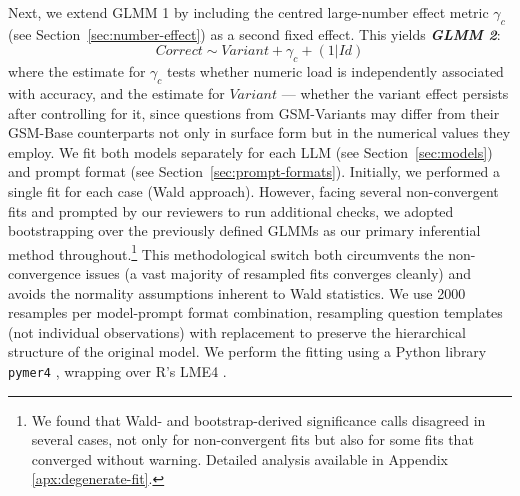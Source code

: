 \documentclass[11pt]{article}
\begin{document}
Next, we extend GLMM 1 by including the centred large-number effect metric $\gamma_c$ (see Section~\ref{sec:number-effect}) as a second fixed effect. This yields \textbf{\textit{GLMM 2}}:
%
\begin{equation}
    Correct \sim Variant + \gamma_c + (1 | Id)
\end{equation}
%
where the estimate for $\gamma_c$ tests whether numeric load is independently associated with accuracy, and the estimate for $Variant$ --- whether the variant effect persists after controlling for it, since questions from GSM-Variants may differ from their GSM-Base counterparts not only in surface form but in the numerical values they employ. We fit both models separately for each LLM (see Section~\ref{sec:models}) and prompt format (see Section~\ref{sec:prompt-formats}).
Initially, we performed a single fit for each case (Wald approach). However, facing several non-convergent fits and prompted by our reviewers to run additional checks, we adopted bootstrapping over the previously defined GLMMs as our primary inferential method throughout.\footnote{We found that Wald- and bootstrap-derived significance calls disagreed in several cases, not only for non-convergent fits but also for some fits that converged without warning. Detailed analysis available in Appendix \ref{apx:degenerate-fit}.} This methodological switch both circumvents the non-convergence issues (a vast majority of resampled fits converges cleanly) and avoids the normality assumptions inherent to Wald statistics. We use 2000 resamples per model-prompt format combination, resampling question templates (not individual observations) with replacement to preserve the hierarchical structure of the original model. We perform the fitting using a Python library \texttt{pymer4} \cite{jolly2018pymer4}, wrapping over R's LME4 \cite{Bates2015lme4}. 
\end{document}

